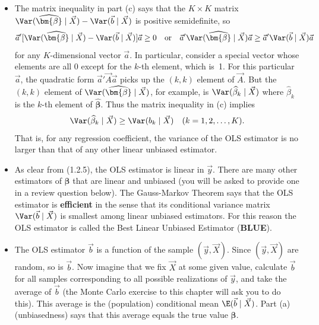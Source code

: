 \begin{itemize}
  \item The matrix inequality in part (c) says that the $K \times K$ matrix
    $\Var(\widehat{\bm{\beta}} \mid \vec{X}) - \Var(\vec{b} \mid \vec{X})$ is positive
    semidefinite, so
    \[
      \vec{a}'[\Var(\widehat{\bm{\beta}} \mid \vec{X})
        - \Var(\vec{b} \mid \vec{X})]\vec{a} \geq 0
      \quad\text{or}\quad
      \vec{a}' \Var(\widehat{\bm{\beta}} \mid \vec{X})\vec{a}
        \geq \vec{a}' \Var(\vec{b} \mid \vec{X})\vec{a}
    \]
    for any $K$-dimensional vector $\vec{a}$.  In particular, consider a special vector
    whose elements are all 0 except for the $k$-th element, which is~1.  For this
    particular $\vec{a}$, the quadratic form $\vec{a}'\vec{A}\vec{a}$ picks up the
    $(k,k)$ element of $\vec{A}$.  But the $(k,k)$ element of
    $\Var(\widehat{\bm{\beta}} \mid \vec{X})$, for example, is
    $\Var(\widehat{\beta}_{k} \mid \vec{X})$ where $\widehat{\beta}_{k}$ is the $k$-th
    element of $\widehat{\bm{\beta}}$.  Thus the matrix inequality in (c) implies
    \begin{equation}
      \Var(\widehat{\beta}_{k} \mid \vec{X})
        \geq \Var(b_{k} \mid \vec{X})
      \quad (k = 1, 2, \ldots, K).
      \label{eq:1.3.1}
    \end{equation}
    That is, for any regression coefficient, the variance of the OLS estimator is no
    larger than that of any other linear unbiased estimator.

  \item As clear from (1.2.5), the OLS estimator is linear in $\vec{y}$.  There are many
    other estimators of $\bm{\beta}$ that are linear and unbiased (you will be asked to
    provide one in a review question below).  The Gauss-Markov Theorem says that the OLS
    estimator is \textbf{efficient} in the sense that its conditional variance matrix
    $\Var(\vec{b} \mid \vec{X})$ is smallest among linear unbiased estimators.  For this
    reason the OLS estimator is called the Best Linear Unbiased Estimator (\textbf{BLUE}).

  \item The OLS estimator $\vec{b}$ is a function of the sample $(\vec{y}, \vec{X})$.
    Since $(\vec{y}, \vec{X})$ are random, so is $\vec{b}$.  Now imagine that we fix
    $\vec{X}$ at some given value, calculate $\vec{b}$ for all samples corresponding to
    all possible realizations of $\vec{y}$, and take the average of $\vec{b}$ (the Monte
    Carlo exercise to this chapter will ask you to do this).  This average is the
    (population) conditional mean $\E(\vec{b} \mid \vec{X})$.  Part (a) (unbiasedness)
    says that this average equals the true value $\bm{\beta}$.


\end{itemize}
